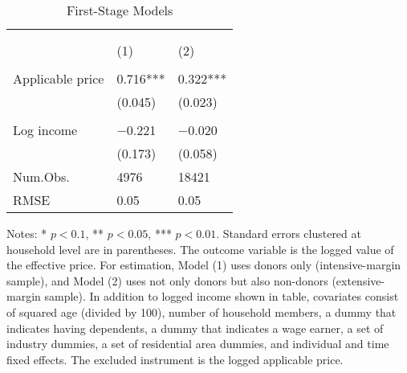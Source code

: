 \begin{table}

\caption{First-Stage Models\label{tab:main-stage1}}
\centering
\fontsize{8}{10}\selectfont
\begin{threeparttable}
\begin{tabular}[t]{l>{\centering\arraybackslash}p{18.75em}>{\centering\arraybackslash}p{18.75em}}
\toprule
\multicolumn{1}{c}{ } & \multicolumn{2}{c}{Effective price} \\
\cmidrule(l{3pt}r{3pt}){2-3}
\multicolumn{1}{c}{ } & \multicolumn{1}{c}{Donors (Intensive-margin)} & \multicolumn{1}{c}{Donors and Non-donors (Extensive-margin)} \\
\cmidrule(l{3pt}r{3pt}){2-2} \cmidrule(l{3pt}r{3pt}){3-3}
  & (1) & (2)\\
\midrule
\addlinespace[0.3em]
\multicolumn{3}{l}{\textit{Excluded instruments}}\\
\hspace{1em}Applicable price & \num{0.716}*** & \num{0.322}***\\
\hspace{1em} & (\num{0.045}) & (\num{0.023})\\
\addlinespace[0.3em]
\multicolumn{3}{l}{\textit{Covariates}}\\
\hspace{1em}Log income & \num{-0.221} & \num{-0.020}\\
\hspace{1em} & (\num{0.173}) & (\num{0.058})\\
\midrule
Num.Obs. & \num{4976} & \num{18421}\\
RMSE & \num{0.05} & \num{0.05}\\
\bottomrule
\end{tabular}
\begin{tablenotes}
\item Notes: * $p < 0.1$, ** $p < 0.05$, *** $p < 0.01$. Standard errors clustered at household level are in parentheses. The outcome variable is the logged value of the effective price. For estimation, Model (1) uses donors only (intensive-margin sample), and Model (2) uses not only donors but also non-donors (extensive-margin sample). In addition to logged income shown in table, covariates consist of squared age (divided by 100), number of household members, a dummy that indicates having dependents, a dummy that indicates a wage earner, a set of industry dummies, a set of residential area dummies, and individual and time fixed effects. The excluded instrument is the logged applicable price.
\end{tablenotes}
\end{threeparttable}
\end{table}
